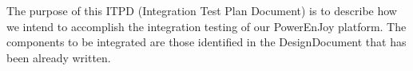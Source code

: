 The purpose of this ITPD (Integration Test Plan Document) is to describe how we intend to accomplish the integration testing of our PowerEnJoy platform. The components to be integrated are those identified in the DesignDocument that has been already written.